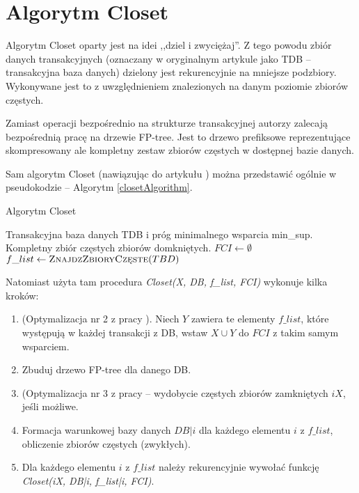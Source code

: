 \section{Algorytm Closet}

Algorytm Closet oparty jest na idei ,,dziel i zwyciężaj''. 
Z tego powodu zbiór danych transakcyjnych (oznaczany w oryginalnym artykule jako TDB -- transakcyjna baza danych) dzielony jest rekurencyjnie na mniejsze podzbiory. Wykonywane jest to z uwzględnieniem znalezionych na danym poziomie zbiorów częstych.

Zamiast operacji bezpośrednio na strukturze transakcyjnej autorzy zalecają bezpośrednią pracę na drzewie FP-tree. 
Jest to drzewo prefiksowe reprezentujące skompresowany ale kompletny zestaw zbiorów częstych w dostępnej bazie danych.

Sam algorytm Closet (nawiązując do artykułu \cite{closetArt}) można przedstawić ogólnie w pseudokodzie -- Algorytm \ref{closetAlgorithm}.

\begin{algorithm}
\caption{Algorytm Closet}
\label{closetAlgorithm}
\renewcommand{\algorithmicrequire}{\textbf{Wejście:}}
\renewcommand{\algorithmicensure}{\textbf{Wyjście:}}
\begin{algorithmic}
	\Require Transakcyjna baza danych TDB i próg minimalnego wsparcia min\_sup.
	\Ensure  Kompletny zbiór częstych zbiorów domkniętych.
		\State $FCI \gets \emptyset$ 
		\State $f\_list \gets \Call{ZnajdzZbioryCzęste}{TBD}$ 
		\State \Return {}
	\EndFunction
\end{algorithmic}
\end{algorithm}

Natomiast użyta tam procedura \textit{Closet(X, DB, f\_list, FCI)} wykonuje kilka kroków: 

\begin{enumerate}
  \item (Optymalizacja nr 2 z pracy \cite{closetArt}). Niech $Y$ zawiera te elementy $f\_list$, które występują w każdej transakcji z DB, wstaw $X \cup Y$ do $FCI$ z takim samym wsparciem.
  \item Zbuduj drzewo FP-tree dla danego DB.
  \item (Optymalizacja nr 3 z pracy \cite{closetArt} -- wydobycie częstych zbiorów zamkniętych $iX$, jeśli możliwe.
  \item Formacja warunkowej bazy danych $DB|i$ dla każdego elementu $i$ z	 $f\_list$, obliczenie zbiorów częstych (zwykłych). 
  \item Dla każdego elementu $i$ z $f\_list$ należy rekurencyjnie wywołać funkcję \textit{Closet(iX, DB|i, f\_list|i, FCI)}.
\end{enumerate}

